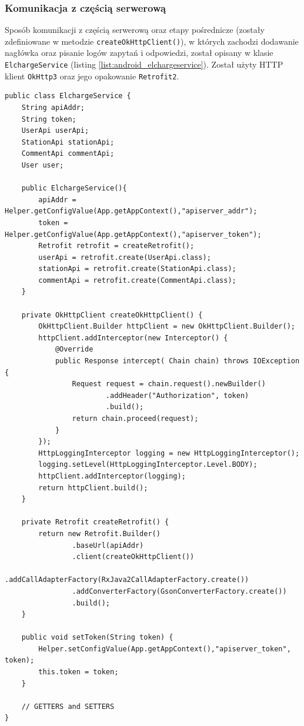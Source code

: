 \subsubsection{Komunikacja z częścią serwerową}
Sposób komunikacji z częścią serwerową oraz etapy pośrednicze (zostały zdefiniowane w metodzie \texttt{createOkHttpClient()}), w których zachodzi dodawanie nagłówka oraz pisanie logów zapytań i odpowiedzi, został opisany w klasie \texttt{ElchargeService} (listing \ref{list:android_elchargeservice}). Został użyty HTTP klient \texttt{OkHttp3} oraz jego opakowanie \texttt{Retrofit2}.
\begin{lstlisting}[label=list:android_elchargeservice,caption=obsługa komunikacji z częścią serwerową,basicstyle=\tiny\ttfamily]
    public class ElchargeService {
    String apiAddr;
    String token;
    UserApi userApi;
    StationApi stationApi;
    CommentApi commentApi;
    User user;

    public ElchargeService(){
        apiAddr = Helper.getConfigValue(App.getAppContext(),"apiserver_addr");
        token = Helper.getConfigValue(App.getAppContext(),"apiserver_token");
        Retrofit retrofit = createRetrofit();
        userApi = retrofit.create(UserApi.class);
        stationApi = retrofit.create(StationApi.class);
        commentApi = retrofit.create(CommentApi.class);
    }

    private OkHttpClient createOkHttpClient() {
        OkHttpClient.Builder httpClient = new OkHttpClient.Builder();
        httpClient.addInterceptor(new Interceptor() {
            @Override
            public Response intercept( Chain chain) throws IOException {
                Request request = chain.request().newBuilder()
                        .addHeader("Authorization", token)
                        .build();
                return chain.proceed(request);
            }
        });
        HttpLoggingInterceptor logging = new HttpLoggingInterceptor();
        logging.setLevel(HttpLoggingInterceptor.Level.BODY);
        httpClient.addInterceptor(logging);
        return httpClient.build();
    }

    private Retrofit createRetrofit() {
        return new Retrofit.Builder()
                .baseUrl(apiAddr)
                .client(createOkHttpClient())
                .addCallAdapterFactory(RxJava2CallAdapterFactory.create())
                .addConverterFactory(GsonConverterFactory.create())
                .build();
    }

    public void setToken(String token) {
        Helper.setConfigValue(App.getAppContext(),"apiserver_token", token);
        this.token = token;
    }

    // GETTERS and SETTERS
}
\end{lstlisting}

